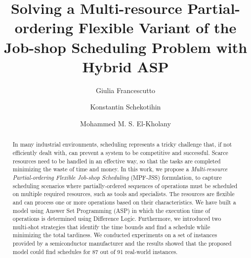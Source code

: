 \documentclass[submission,copyright,creativecommons]{eptcs}
\title{Solving a Multi-resource Partial-ordering Flexible Variant of the Job-shop Scheduling Problem with Hybrid ASP}
\author{Giulia Francescutto
\institute{Siemens AG {\"O}sterreich\\ Vienna, Austria}
\email{giulia.francescutto@siemens.com}
\and
Konstantin Schekotihin
\institute{Univeristy of Klagenfurt\\
Klagenfurt, Austria}
\email{konstantin.schekotihin@aau.at}
\and
Mohammed M. S. El-Kholany
\institute{Univeristy of Klagenfurt\\ Klagenfurt, Austria}
\institute{Cairo University\\ Cairo, Egypt.}
\email{mohammed.el-kholany@aau.at}
}
\newcommand{\jss}{MPF-JSS\xspace}
\begin{document}
\maketitle

\begin{abstract}
  In many industrial environments, scheduling represents a tricky challenge that, if not efficiently dealt with, can prevent a system to be competitive and successful. Scarce resources need to be handled in an effective way, so that the tasks are completed minimizing the waste of time and money. In this work, we propose a \emph{Multi-resource Partial-ordering Flexible Job-shop Scheduling} (\jss) formulation, to capture scheduling scenarios where partially-ordered sequences of operations must be scheduled on multiple required resources, such as tools and specialists.%
  The resources are flexible and can process one or more operations based on their characteristics. We have built a model using Answer Set Programming (ASP) in which the execution time of operations is determined using Difference Logic. Furthermore, we introduced two multi-shot strategies that identify the time bounds and find a schedule while minimizing the total tardiness. We conducted experiments on a set of instances provided by a semiconductor manufacturer and the results showed that the proposed model could find schedules for 87 out of 91 real-world instances.
\end{abstract}
\end{document}
